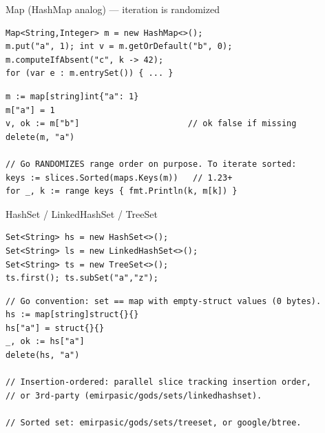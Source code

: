 \documentclass[10pt]{article}
\begin{document}
\begin{construct}{Map (HashMap analog) --- iteration is randomized}
\noindent
\begin{minipage}[t]{0.485\linewidth}
\begin{lstlisting}[style=java, title=Java]
Map<String,Integer> m = new HashMap<>();
m.put("a", 1); int v = m.getOrDefault("b", 0);
m.computeIfAbsent("c", k -> 42);
for (var e : m.entrySet()) { ... }
\end{lstlisting}
\end{minipage}\hfill
\begin{minipage}[t]{0.485\linewidth}
\begin{lstlisting}[style=go, title=Go]
m := map[string]int{"a": 1}
m["a"] = 1
v, ok := m["b"]                      // ok false if missing
delete(m, "a")

// Go RANDOMIZES range order on purpose. To iterate sorted:
keys := slices.Sorted(maps.Keys(m))   // 1.23+
for _, k := range keys { fmt.Println(k, m[k]) }
\end{lstlisting}
\end{minipage}
\end{construct}


\begin{construct}{HashSet / LinkedHashSet / TreeSet}
\noindent
\begin{minipage}[t]{0.485\linewidth}
\begin{lstlisting}[style=java, title=Java]
Set<String> hs = new HashSet<>();
Set<String> ls = new LinkedHashSet<>();
Set<String> ts = new TreeSet<>();
ts.first(); ts.subSet("a","z");
\end{lstlisting}
\end{minipage}\hfill
\begin{minipage}[t]{0.485\linewidth}
\begin{lstlisting}[style=go, title=Go]
// Go convention: set == map with empty-struct values (0 bytes).
hs := map[string]struct{}{}
hs["a"] = struct{}{}
_, ok := hs["a"]
delete(hs, "a")

// Insertion-ordered: parallel slice tracking insertion order,
// or 3rd-party (emirpasic/gods/sets/linkedhashset).

// Sorted set: emirpasic/gods/sets/treeset, or google/btree.
\end{lstlisting}
\end{minipage}
\end{construct}
\end{document}
